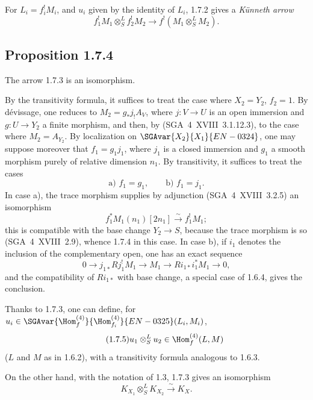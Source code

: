 For $L_i=f_i^{!}M_i$, and $u_i$ given by the identity of $L_i$, 1.7.2 gives a \emph{Künneth arrow}
\begin{equation}\tag{1.7.3}
f_1^{!}M_1\otimes^L_Sf_2^{!}M_2\longrightarrow f^{!}(M_1\otimes^L_SM_2).
\end{equation}

\subsection*{Proposition 1.7.4}
The arrow 1.7.3 is an isomorphism.

By the transitivity formula, it suffices to treat the case where $X_2=Y_2$, $f_2=1$. By dévissage, one reduces to $M_2=g_{*}j_{!}A_V$, where $j:V\to U$ is an open immersion and $g:U\to Y_2$ a finite morphism, and then, by (SGA~4~XVIII~3.1.12.3), to the case where $M_2=A_{Y_2}$. By localization on $\SGAvar{X_2}{X_1}{EN-0324}$, one may suppose moreover that $f_1=g_1j_1$, where $j_1$ is a closed immersion and $g_1$ a smooth morphism purely of relative dimension $n_1$. By transitivity, it suffices to treat the cases
\[
\text{a) } f_1=g_1,\qquad \text{b) } f_1=j_1.
\]
In case a), the trace morphism supplies by adjunction (SGA~4~XVIII~3.2.5) an isomorphism
\[
f_1^{*}M_1(n_1)[2n_1]\xrightarrow{\sim}f_1^{!}M_1;
\]
this is compatible with the base change $Y_2\to S$, because the trace morphism is so (SGA~4~XVIII~2.9), whence 1.7.4 in this case. In case b), if $i_1$ denotes the inclusion of the complementary open, one has an exact sequence
\[
0\longrightarrow j_{1*}Rj_1^{!}M_1\longrightarrow M_1\longrightarrow Ri_{1*}i_1^{*}M_1\longrightarrow0,
\]
and the compatibility of $Ri_{1*}$ with base change, a special case of 1.6.4, gives the conclusion.

Thanks to 1.7.3, one can define, for $u_i\in\SGAvar{\Hom_{f}^{(4)}}{\Hom_{f_i}^{(4)}}{EN-0325}(L_i,M_i)$,
\begin{equation}\tag{1.7.5}
u_1\otimes^L_Su_2\in\Hom_f^{(4)}(L,M)
\end{equation}
($L$ and $M$ as in 1.6.2), with a transitivity formula analogous to 1.6.3.

On the other hand, with the notation of 1.3, 1.7.3 gives an isomorphism
\begin{equation}\tag{1.7.6}
K_{X_1}\otimes^L_SK_{X_2}\xrightarrow{\sim}K_X.
\end{equation}

